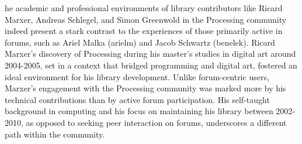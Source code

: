 


he academic and professional environments of library contributors like Ricard Marxer, Andreas Schlegel, and Simon Greenwold in the Processing community indeed present a stark contrast to the experiences of those primarily active in forums, such as Ariel Malka (arielm) and Jacob Schwartz (benelek).
Ricard Marxer's discovery of Processing during his master's studies in digital art around 2004-2005, set in a context that bridged programming and digital art, fostered an ideal environment for his library development. Unlike forum-centric users, Marxer's engagement with the Processing community was marked more by his technical contributions than by active forum participation. His self-taught background in computing and his focus on maintaining his library between 2002-2010, as opposed to seeking peer interaction on forums, underscores a different path within the community​​​​.

